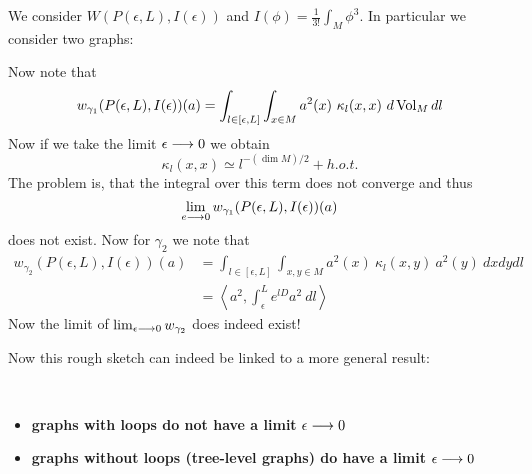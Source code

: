 \begin{sketch}
  We consider $W(P(\epsilon,L), I(\epsilon))$ and $I(\phi) = \frac{1}{3!} \int_M \phi^3$. In particular we consider two graphs:

  \begin{center}
  \end{center}

  Now note that
  $$ w_{\gamma_1} (P(\epsilon,L), I(\epsilon))(a) = \int_{l\in[\epsilon,L]} \int_{x\in M} a^2(x) \ \kappa_l(x,x) \ d\vol_M dl$$
  Now if we take the limit $\epsilon \lra 0$ we obtain
  $$ \kappa_l(x,x) \simeq l^{-(\dim M)/2} + h.o.t. $$
  The problem is, that the integral over this term does not converge and thus
  $$ \lim_{e\lra 0} w_{\gamma_1} (P(\epsilon,L), I(\epsilon))(a) $$
  does not exist. Now for $\gamma_2$ we note that
  \begin{align*}
    w_{\gamma_2} (P(\epsilon,L), I(\epsilon))(a) &= \int_{l\in[\epsilon,L]} \int_{x,y\in M} a^2(x) \ \kappa_l(x,y) \ a^2(y) \ dx dy dl \\
    &= \left\langle a^2, \int_\epsilon^L e^{lD} a^2 \ dl \right\rangle
  \end{align*}
  Now the limit of $\lim_{\epsilon \lra 0} w_{\gamma_2}$ does indeed exist!
\end{sketch}

Now this rough sketch can indeed be linked to a more general result:

\begin{fact}~
\begin{itemize}
  \item \textbf{graphs with loops do not have a limit} $\epsilon \lra 0$
  \item \textbf{graphs without loops (tree-level graphs) do have a limit} $\epsilon \lra 0$
\end{itemize}
\end{fact}

